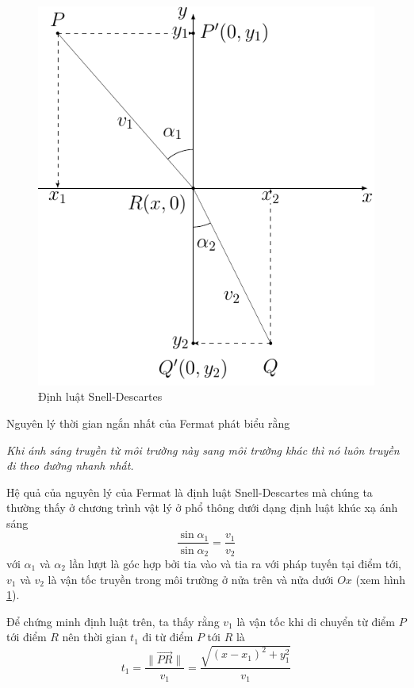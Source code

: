 \documentclass{mynotes}
\theoremstyle{definition}
\begin{document}
\begin{figure}[ht]
    \centering
    \includegraphics{brachistochrone/fermat.pdf}
    \caption{Định luật Snell-Descartes}
    \label{cycloid:snell}
\end{figure}

Nguyên lý thời gian ngắn nhất của Fermat phát biểu rằng

\textit{Khi ánh sáng truyền từ môi trường này sang môi trường khác thì nó luôn truyền đi theo đường nhanh nhất.}

Hệ quả của nguyên lý của Fermat là định luật Snell-Descartes mà chúng ta thường thấy ở chương trình vật lý ở phổ thông dưới dạng định luật khúc xạ ánh sáng
\begin{equation}
    \frac{\sin \alpha_1}{\sin \alpha_2} = \frac{v_1}{v_2}
\end{equation}
với $\alpha_1$ và $\alpha_2$ lần lượt là góc hợp bởi tia vào và tia ra với pháp tuyến tại điểm tới, $v_1$ và $v_2$ là vận tốc truyền trong môi trường ở nửa trên và nửa dưới $Ox$ (xem hình \ref{cycloid:snell}).

Để chứng minh định luật trên, ta thấy rằng $v_1$ là vận tốc khi di chuyển từ điểm $P$ tới điểm $R$ nên thời gian $t_1$ đi từ điểm $P$ tới $R$ là
\begin{equation}
    t_1 = \frac{\lVert \overrightarrow{PR} \rVert}{v_1} = \frac{\sqrt{(x - x_1)^2 + y_1^2}}{v_1}
\end{equation}
\end{document}
